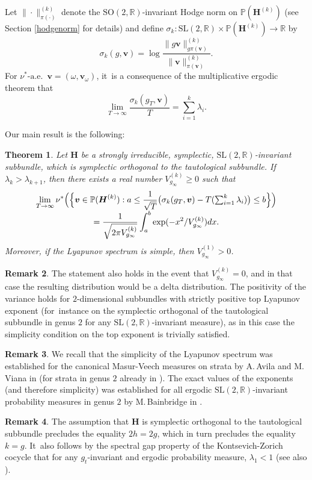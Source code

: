 \documentclass[JEP,XML,SOM,Unicode,published]{cedram}
\theoremstyle{plain}
\newtheorem{thm}{Theorem}[section]
\theoremstyle{definition}
\newtheorem{rem}[thm]{Remark}
\numberwithin{equation}{subsection}
\newcommand\bP{\mathbb{P}}
\newcommand\bR{\mathbb{R}}\let\R\bR
\newcommand{\SL}{\mathrm{SL}}
\newcommand{\SO}{\mathrm{SO}}
\newcommand{\bfH}{\boldsymbol{H}}
\newcommand{\bfv}{\boldsymbol{v}}
\begin{document}
Let $\|\cdot\|^{(k)}_{\pi(\cdot)}$ denote the $\SO(2,\bR)$-invariant Hodge norm on $\bP (\bfH^{(k)})$ (see Section \ref{hodgenorm} for details) and define\vspace*{-3pt}
$\sigma_k : \SL(2,\bR) \times \bP (\bfH^{(k)}) \to \bR$ by
\[
\sigma_k(g,\bfv) = \log \frac{\|g \bfv\|^{(k)}_{g\pi(\bfv)}}{\|\bfv\|^{(k)}_{\pi(\bfv)}}.
\]
For $\nu^*\text{-a.e.}$~$\bfv = (\omega,\bfv_\omega)$, it~is a consequence of the multiplicative ergodic theorem that\vspace*{-3pt}
\[
\lim_{T\to\infty} \frac{\sigma_k(g_T, \bfv)}{T} = \sum_{i=1}^k \lambda_i.
\]

Our main result is the following:
\begin{thm}\label{dclt}
Let $\bfH$ be a strongly irreducible, symplectic, $\SL(2,\R)$-invariant subbundle, which is symplectic orthogonal to the tautological subbundle. If $\lambda_k > \lambda_{k+1}$, then there exists a real number $V^{(k)}_{g_\infty} \geq 0$ such that\vspace*{-3pt}
\begin{multline*}
\lim_{T\to\infty}\nu^*\Bigl(\Bigl\{\bfv\in \bP(\bfH^{(k)}) :a \leq \frac{1}{\sqrt{T}} \bigl(\sigma_k(g_{T}, \bfv)- T(\textstyle\sum_{i=1}^k \lambda_i) \bigr) \leq b\Bigr\}\Bigr)\\[-3pt]
= \frac{1}{\sqrt{2\pi V^{(k)}_{g_\infty}}}\int_a^b\exp(-x^2/ V^{(k)}_{g_\infty})dx.
\end{multline*}
Moreover, if the Lyapunov spectrum is simple, then $V^{(1)}_{g_\infty} > 0$.
\end{thm}
\begin{rem}
The statement also holds in the event that $V^{(k)}_{g_\infty} = 0$, and in that case the resulting distribution would be a delta distribution. The positivity of the variance holds for $2$-dimensional subbundles with strictly positive top Lyapunov exponent (for~instance on the symplectic orthogonal of the tautological subbundle in genus $2$ for any $\SL(2,\R)$-invariant measure), as in this case the simplicity condition on the top exponent is trivially satisfied.
\end{rem}
\begin{rem}
We recall that the simplicity of the Lyapunov spectrum was established for the canonical Masur-Veech measures on strata by A.\,Avila and M.\,Viana in \cite{AV07} (for strata in genus $2$ already in \cite{For02}). The exact values of the exponents (and therefore simplicity) was established for all ergodic $\SL(2,\bR)$-invariant probability measures in genus $2$ by M.\,Bainbridge in \cite{B07}.
\end{rem}
\begin{rem}
The assumption that $\bfH$ is symplectic orthogonal to the tautological subbundle precludes the equality $2h=2g$, which in turn precludes the equality $k = g$. It~also follows by the spectral gap property of the Kontsevich-Zorich cocycle that for any $g_t$-invariant and ergodic probability measure, $\lambda_1<1$ \cite{For02} (see also \cite[Cor.\,2.2]{FMZ12}).
\end{rem}
\end{document}
